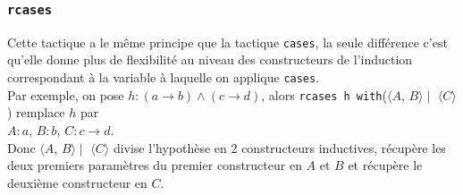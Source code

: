     \subsubsection{ \texttt{rcases}}
     Cette tactique a le même principe que la tactique \texttt{cases}, la seule différence c'est qu'elle donne plus de flexibilité au niveau des constructeurs de l'induction correspondant à la variable à laquelle on applique \texttt{cases}. \\ Par exemple, on pose $h:(a\rightarrow b)\wedge(c\rightarrow d)$, alors \texttt{rcases h with}($\langle A$, $B \rangle \mid $ $\langle C \rangle$) remplace $h$ par \\ $A:a$, $B:b$, $C:c\rightarrow d$.\\ Donc $\langle A$, $B \rangle \mid$ $\langle C\rangle$ divise l'hypothèse en 2 constructeurs inductives, récupère les deux premiers paramètres du premier constructeur en $A$ et $B$ et récupère le deuxième constructeur en $C$. 
